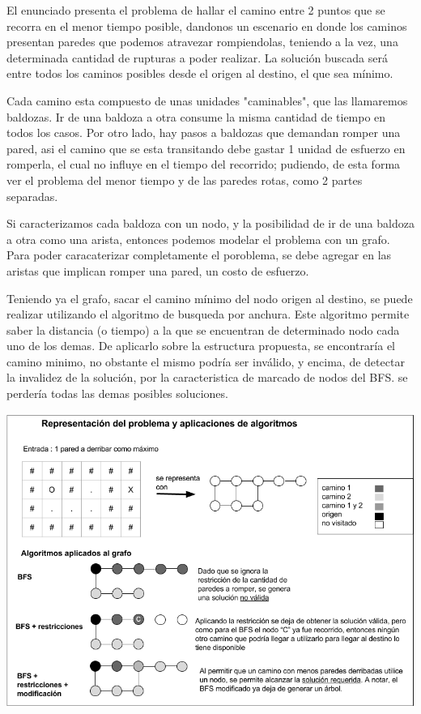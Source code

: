 El enunciado presenta el problema de hallar el camino entre 2 puntos que se recorra en el menor tiempo posible, dandonos un escenario en donde los caminos presentan paredes que podemos atravezar rompiendolas, teniendo a la vez, una determinada cantidad de rupturas a poder realizar. La solución buscada será entre todos los caminos posibles desde el origen al destino, el que sea mínimo.

Cada camino esta compuesto de unas unidades "caminables", que las llamaremos baldozas. Ir de una baldoza a otra consume la misma cantidad de tiempo en todos los casos. Por otro lado, hay pasos a baldozas que demandan romper una pared, asi el camino que se esta transitando debe gastar 1 unidad de esfuerzo en romperla, el cual no influye en el tiempo del recorrido; pudiendo, de esta forma ver el problema del menor tiempo y de las paredes rotas, como 2 partes separadas.

Si caracterizamos cada baldoza con un nodo, y la posibilidad de ir de una baldoza a otra como una arista, entonces podemos modelar el problema con un grafo. Para poder caracaterizar completamente el poroblema, se debe agregar en las aristas que implican romper una pared, un costo de esfuerzo.

Teniendo ya el grafo, sacar el camino mínimo del nodo origen al destino, se puede realizar utilizando el algoritmo de busqueda por anchura. Este algoritmo permite saber la distancia (o tiempo) a la que se encuentran de determinado nodo cada uno de los demas. De aplicarlo sobre la estructura propuesta, se encontraría el camino minimo, no obstante el mismo podría ser inválido, y encima, de detectar la invalidez de la solución, por la caracteristica de marcado de nodos del BFS. se perdería todas las demas posibles soluciones.

  \vspace*{0.3cm} \vspace*{0.3cm}
  \begin{center}
 \includegraphics[scale=0.6]{./EJ1/ej1-explicacion.png}
  \end{center}
  \vspace*{0.3cm}

